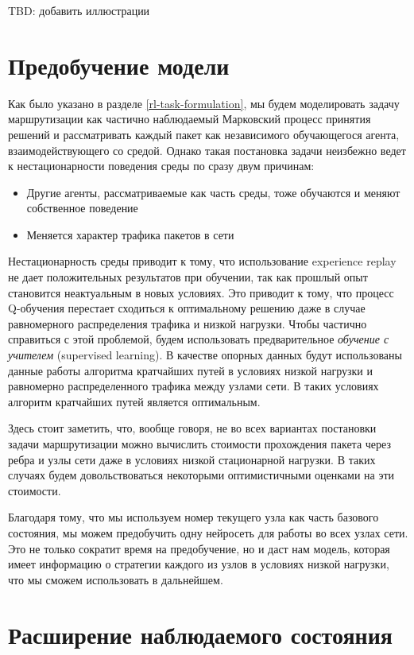 \documentclass[specification, annotation]{itmo-student-thesis}
\begin{document}
TBD: добавить иллюстрации

\section{Предобучение модели}


Как было указано в разделе \ref{rl-task-formulation}, мы будем моделировать
задачу маршрутизации как частично наблюдаемый Марковский процесс принятия
решений и рассматривать каждый пакет как независимого обучающегося агента,
взаимодействующего со средой. Однако такая постановка задачи неизбежно ведет к
нестационарности поведения среды по сразу двум причинам:

\begin{itemize}
\item Другие агенты, рассматриваемые как часть среды, тоже обучаются и меняют
  собственное поведение
\item Меняется характер трафика пакетов в сети
\end{itemize}

Нестационарность среды приводит к тому, что использование experience replay не
дает положительных результатов при обучении, так как прошлый опыт становится
неактуальным в новых условиях. Это приводит к тому, что процесс Q-обучения
перестает сходиться к оптимальному решению даже в случае равномерного
распределения трафика и низкой нагрузки. Чтобы частично справиться с этой
проблемой, будем использовать предварительное \textit{обучение с учителем}
(supervised learning). В качестве опорных данных будут использованы данные
работы алгоритма кратчайших путей в условиях низкой нагрузки и равномерно
распределенного трафика между узлами сети. В таких условиях алгоритм кратчайших
путей является оптимальным.

Здесь стоит заметить, что, вообще говоря, не во всех вариантах постановки задачи
маршрутизации можно вычислить стоимости прохождения пакета через ребра и узлы
сети даже в условиях низкой стационарной нагрузки. В таких случаях будем
довольствоваться некоторыми оптимистичными оценками на эти стоимости.

Благодаря тому, что мы используем номер текущего узла как часть базового
состояния, мы можем предобучить одну нейросеть для работы во всех узлах сети.
Это не только сократит время на предобучение, но и даст нам модель, которая
имеет информацию о стратегии каждого из узлов в условиях низкой нагрузки, что мы
сможем использовать в дальнейшем.

\section{Расширение наблюдаемого состояния}
\end{document}
